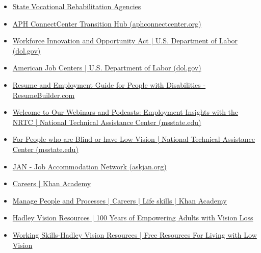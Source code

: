 \begin{itemize}[leftmargin=1.0cm]
\begin{itemize}
		      \item \href{https://nam11.safelinks.protection.outlook.com/?url=https%3A%2F%2Frsa.ed.gov%2Fabout%2Fstates&data=05%7C01%7Cchris_fendrick%40kernhigh.org%7Cbc7ebcd1034f4b8956c808da4e0886ed%7C79e9a47a04484925bf6638dadfc6f0a4%7C0%7C0%7C637908095803823825%7CUnknown%7CTWFpbGZsb3d8eyJWIjoiMC4wLjAwMDAiLCJQIjoiV2luMzIiLCJBTiI6Ik1haWwiLCJXVCI6Mn0%3D%7C3000%7C%7C%7C&sdata=7Yp0WqYpmUt23krj04UuAfM%2FfPtXDqngbOewfl9go10%3D&reserved=0}{State Vocational Rehabilitation Agencies}
		      \item \href{https://aphconnectcenter.org/TransitionHub/}{APH ConnectCenter Transition Hub (aphconnectcenter.org)}
		      \item \href{https://www.dol.gov/agencies/eta/wioa#main-content}{Workforce Innovation and Opportunity Act | U.S. Department of Labor (dol.gov)}
		      \item \href{https://www.dol.gov/general/topic/training/onestop#main-content}{American Job Centers | U.S. Department of Labor (dol.gov)}
		      \item \href{https://www.resumebuilder.com/comprehensive-resume-and-career-guide-for-people-with-disabilities/}{Resume and Employment Guide for People with Disabilities - ResumeBuilder.com}
		      \item \href{https://www.ntac.blind.msstate.edu/consumers/webinars-podcasts}{Welcome to Our Webinars and Podcasts: Employment Insights with the NRTC | National Technical Assistance Center (msstate.edu)}
		      \item \href{https://www.ntac.blind.msstate.edu/consumers}{For People who are Blind or have Low Vision | National Technical Assistance Center (msstate.edu)}
		      \item \href{https://askjan.org/}{JAN - Job Accommodation Network (askjan.org)}
		      \item \href{https://www.khanacademy.org/search?referer=%2F&page_search_query=careers}{Careers | Khan Academy}
		      \item \href{https://www.khanacademy.org/college-careers-more/career-content/manage-people-and-processes#main-content}{Manage People and Processes | Careers | Life skills | Khan Academy}
		      \item \href{https://hadley.edu/}{Hadley Vision Resources | 100 Years of Empowering Adults with Vision Loss}
		      \item \href{https://hadley.edu/learn#main-content?topic_id=16}{Working Skills-Hadley Vision Resources | Free Resources For Living with Low Vision}

\end{itemize}
\end{itemize}
